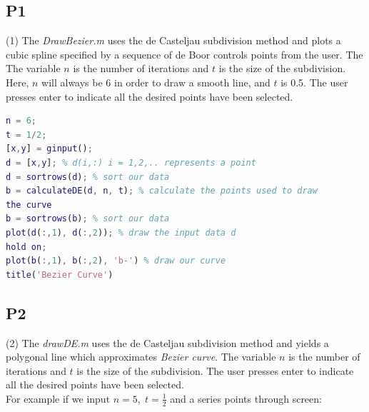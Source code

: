 \documentclass[12pt]{article}
\begin{document}
\subsection*{P1}
(1) 
The \textit{DrawBezier.m} uses the de Casteljau subdivision method and plots a cubic spline specified by a sequence of de Boor controls points from the user. The The variable $n$ is the number of iterations and $t$ is the size of the subdivision. Here, $n$ will always be 6 in order to draw a smooth line, and $t$ is 0.5. The user presses enter to indicate all the desired points have been selected. 
\\

\begin{lstlisting}[language=Matlab]
n = 6;
t = 1/2;
[x,y] = ginput(); 
d = [x,y]; % d(i,:) i = 1,2,.. represents a point 
d = sortrows(d); % sort our data 
b = calculateDE(d, n, t); % calculate the points used to draw 
the curve 
b = sortrows(b); % sort our data 
plot(d(:,1), d(:,2)); % draw the input data d
hold on;
plot(b(:,1), b(:,2), 'b-') % draw our curve 
title('Bezier Curve')
\end{lstlisting}

\subsection*{P2}
(2) 
The \textit{drawDE.m} uses the de Casteljau subdivision method and  yields a polygonal line which approximates \textit{Bezier curve}. The variable $n$ is the number of iterations and $t$ is the size of the subdivision. The user presses enter to indicate all the desired points have been selected. 
\\
For example if we input $n = 5 , \; t = \frac{1}{2}$ and a series points through screen: 
\end{document}
